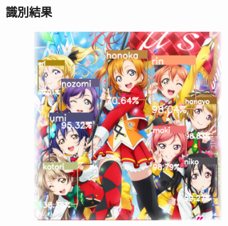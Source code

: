 \documentclass[dvipdfmx,11pt,notheorems]{beamer}
\theoremstyle{definition}
\begin{document}
\begin{frame}\frametitle{識別結果}
\begin{figure}[t]
  \begin{center}
    \includegraphics[clip,width=7cm, bb = 0 0 624 626]{./fig/png/lovelive_classify.png}\\
  \end{center}
\end{figure}
\end{frame}
\end{document}
